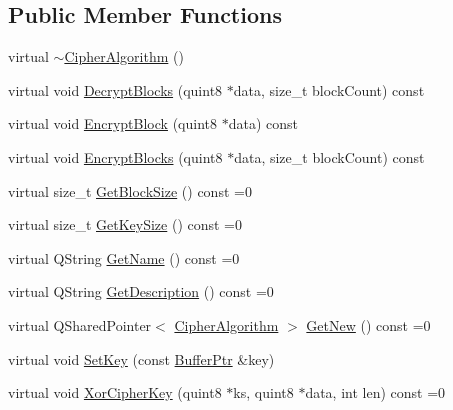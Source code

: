 \subsection*{Public Member Functions}
\begin{DoxyCompactItemize}
\item 
virtual \hyperlink{class_gost_crypt_1_1_volume_1_1_cipher_algorithm_abc36f48a14473f9742a3e1dfc43dfd76}{$\sim$\+Cipher\+Algorithm} ()
\item 
virtual void \hyperlink{class_gost_crypt_1_1_volume_1_1_cipher_algorithm_a0854cec4afed33f1903ab9a37f70e1dd}{Decrypt\+Blocks} (quint8 $\ast$data, size\+\_\+t block\+Count) const
\item 
virtual void \hyperlink{class_gost_crypt_1_1_volume_1_1_cipher_algorithm_aa5ac9c6cceb97f3fe109423716099d05}{Encrypt\+Block} (quint8 $\ast$data) const
\item 
virtual void \hyperlink{class_gost_crypt_1_1_volume_1_1_cipher_algorithm_a8c591791f426796356d6df35c38d8855}{Encrypt\+Blocks} (quint8 $\ast$data, size\+\_\+t block\+Count) const
\item 
virtual size\+\_\+t \hyperlink{class_gost_crypt_1_1_volume_1_1_cipher_algorithm_acea94097c86d12a5e5c7bbee613526a2}{Get\+Block\+Size} () const =0
\item 
virtual size\+\_\+t \hyperlink{class_gost_crypt_1_1_volume_1_1_cipher_algorithm_aaf60dff95401e6f017ce0c2584f0e593}{Get\+Key\+Size} () const =0
\item 
virtual Q\+String \hyperlink{class_gost_crypt_1_1_volume_1_1_cipher_algorithm_a6074cb14cf571b9879eb9f6ac85c1487}{Get\+Name} () const =0
\item 
virtual Q\+String \hyperlink{class_gost_crypt_1_1_volume_1_1_cipher_algorithm_a01b18f6950161fa518115bf08db3a997}{Get\+Description} () const =0
\item 
virtual Q\+Shared\+Pointer$<$ \hyperlink{class_gost_crypt_1_1_volume_1_1_cipher_algorithm}{Cipher\+Algorithm} $>$ \hyperlink{class_gost_crypt_1_1_volume_1_1_cipher_algorithm_a623a1b2ec1b28d583e432f3915eccfc4}{Get\+New} () const =0
\item 
virtual void \hyperlink{class_gost_crypt_1_1_volume_1_1_cipher_algorithm_a7275373584e3304f6a44cdba08da2139}{Set\+Key} (const \hyperlink{class_gost_crypt_1_1_buffer_ptr}{Buffer\+Ptr} \&key)
\item 
virtual void \hyperlink{class_gost_crypt_1_1_volume_1_1_cipher_algorithm_a1be05f68ce3c18e7cd76708739f3f85a}{Xor\+Cipher\+Key} (quint8 $\ast$ks, quint8 $\ast$data, int len) const =0
\item 

\end{DoxyCompactItemize}

